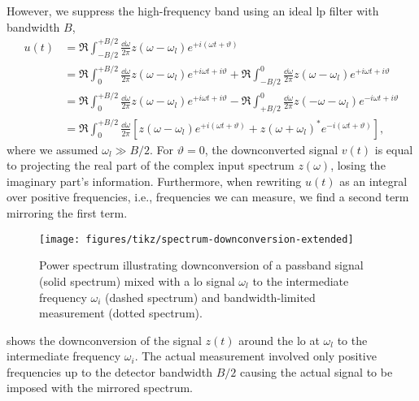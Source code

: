 However, we suppress the high-frequency band using an ideal \gls{lp} filter with bandwidth $B$,
\begin{equation}
	\begin{split}
		u(t)
		&=
		\Re
		\int_{-B/2}^{+B/2}\frac{\dd{\omega}}{2\pi}
		z(\omega-\omega_l)
		e^{+i(\omega t+\vartheta)}
		\\
		&=
		\Re
		\int_{0}^{+B/2}\frac{\dd{\omega}}{2\pi}
		z(\omega-\omega_l)
		e^{+i\omega t+i\vartheta}
		+
		\Re
		\int_{-B/2}^{0}\frac{\dd{\omega}}{2\pi}
		z(\omega-\omega_l)
		e^{+i\omega t+i\vartheta}
		\\
		&=
		\Re
		\int_{0}^{+B/2}\frac{\dd{\omega}}{2\pi}
		z(\omega-\omega_l)
		e^{+i\omega t+i\vartheta}
		-
		\Re
		\int_{+B/2}^{0}\frac{\dd{\omega}}{2\pi}
		z(-\omega-\omega_l)
		e^{-i\omega t+i\vartheta}
		\\
		&=
		\Re
		\int_{0}^{+B/2}\frac{\dd{\omega}}{2\pi}
		\left[
			z(\omega-\omega_l)
			e^{+i(\omega t+\vartheta)}
			+
			z(\omega+\omega_l)^*
			e^{-i(\omega t+\vartheta)}
		\right]
		,
	\end{split}
	\label{eq:downconversion_real}
\end{equation}
where we assumed $\omega_l\gg B/2$.
For $\vartheta=0$, the downconverted signal $v(t)$ is equal to projecting the real part of the complex input spectrum $z(\omega)$, losing the imaginary part's information.
Furthermore, when rewriting $u(t)$ as an integral over positive frequencies, i.e., frequencies we can measure, we find a second term mirroring the first term.
\begin{figure}[htb]
	\centering
	\texttt{[image: figures/tikz/spectrum-downconversion-extended]}
	\caption{Power spectrum illustrating downconversion of a passband signal (solid spectrum) mixed with a \gls{lo} signal $\omega_l$ to the intermediate frequency $\omega_i$ (dashed spectrum) and bandwidth-limited measurement (dotted spectrum).}\label{fig:spectrum_downconversion_extended}
\end{figure}
 shows the downconversion of the signal $z(t)$ around the \gls{lo} at $\omega_l$ to the intermediate frequency $\omega_i$.
The actual measurement involved only positive frequencies up to the detector bandwidth $B/2$ causing the actual signal to be imposed with the mirrored spectrum.

